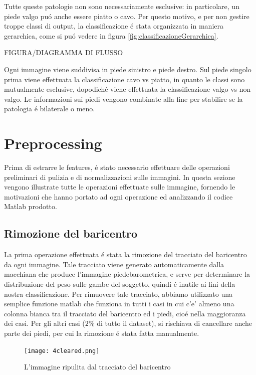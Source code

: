 \documentclass[11pt,a4paper]{article}
\begin{document}
Tutte queste patologie non sono necessariamente esclusive: in particolare, un piede valgo pu\'o anche essere piatto o cavo. Per questo motivo, e per non gestire troppe classi di output, la classificazione \'e stata organizzata in maniera gerarchica, come si pu\'o vedere in figura \ref{fig:classificazioneGerarchica}.

FIGURA/DIAGRAMMA DI FLUSSO

Ogni immagine viene suddivisa in piede sinistro e piede destro. Sul piede singolo prima viene effettuata la classificazione cavo vs piatto, in quanto le classi sono mutualmente esclusive, dopodich\'e viene effettuata la classificazione valgo vs non valgo. Le informazioni sui piedi vengono combinate alla fine per stabilire se la patologia \'e bilaterale o meno.

\section{Preprocessing}
\label{sec:preprocessing}
Prima di estrarre le features, \'e stato necessario effettuare delle operazioni preliminari di pulizia e di normalizzazioni sulle immagini. In questa sezione vengono illustrate tutte le operazioni effettuate sulle immagine, fornendo le motivazioni che hanno portato ad ogni operazione ed analizzando il codice Matlab prodotto.

\subsection{Rimozione del baricentro}
La prima operazione effettuata \'e stata la rimozione del tracciato del baricentro da ogni immagine. Tale tracciato viene generato automaticamente dalla macchiana che produce l'immagine piedebarometrica, e serve per determinare la distribuzione del peso sulle gambe del soggetto, quindi \'e inutile ai fini della nostra classificazione. Per rimuovere tale tracciato, abbiamo utilizzato una semplice funzione matlab che funziona in tutti i casi in cui c'e' almeno una colonna bianca tra il tracciato del baricentro ed i piedi, cio\'e nella maggioranza dei casi. Per gli altri casi ($2\%$ di tutto il dataset), si rischiava di cancellare anche parte dei piedi, per cui la rimozione \'e stata fatta manualmente.

\begin{figure}
\centering
\texttt{[image: 4cleared.png]}
\caption{L'immagine ripulita dal tracciato del baricentro}
\end{figure}
\end{document}
